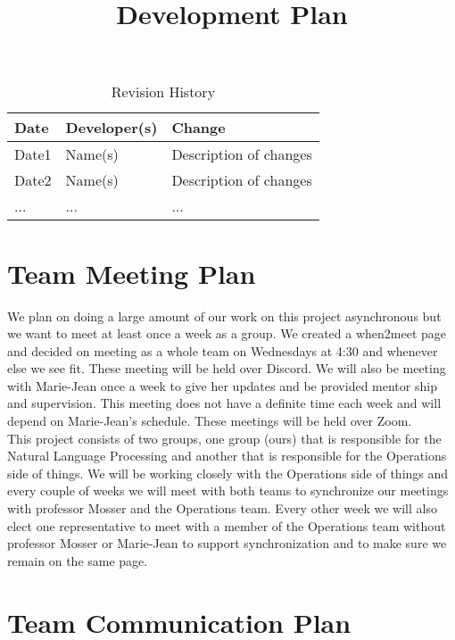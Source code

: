 \documentclass{article}
\title{Development Plan\\\progname}
\author{\authname}
\date{}
\begin{document}
\maketitle

\begin{table}[hp]
\caption{Revision History} \label{TblRevisionHistory}
\begin{tabularx}{\textwidth}{llX}
\toprule
\textbf{Date} & \textbf{Developer(s)} & \textbf{Change}\\
\midrule
Date1 & Name(s) & Description of changes\\
Date2 & Name(s) & Description of changes\\
... & ... & ...\\
\bottomrule
\end{tabularx}
\end{table}


\section{Team Meeting Plan}

We plan on doing a large amount of our work on this project asynchronous but we want to meet at least once a week as a group. We created a when2meet page and decided on meeting as a whole team on Wednesdays at 4:30 and whenever else we see fit. These meeting will be held over Discord. We will also be meeting with Marie-Jean once a week to give her updates and be provided mentor ship and supervision. This meeting does not have a definite time each week and will depend on Marie-Jean's schedule. These meetings will be held over Zoom.\\

This project consists of two groups, one group (ours) that is responsible for the Natural Language Processing and another that is responsible for the Operations side of things. We will be working closely with the Operations side of things and every couple of weeks we will meet with both teams to synchronize our meetings with professor Mosser and the Operations team. Every other week we will also elect one representative to meet with a member of the Operations team without professor Mosser or Marie-Jean to support synchronization and to make sure we remain on the same page.
\section{Team Communication Plan}
\end{document}
